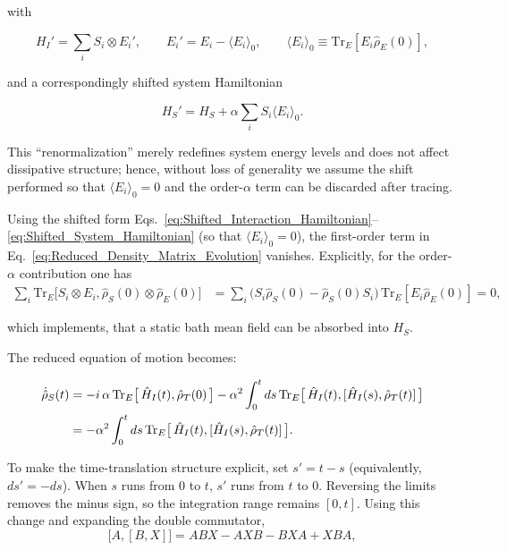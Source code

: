 \noindent
with

\begin{equation}
	H_I' = \sum_i S_i \otimes E_i', \qquad E_i' = E_i - \langle E_i \rangle_0, \qquad \langle E_i \rangle_0 \equiv \mathrm{Tr}_E[E_i \hat{\rho}_E(0)],
	\label{eq:Shifted_Interaction_Hamiltonian}
\end{equation}

\noindent
and a correspondingly shifted system Hamiltonian

\begin{equation}
	H_S' = H_S + \alpha \sum_i S_i \langle E_i \rangle_0.
	\label{eq:Shifted_System_Hamiltonian}
\end{equation}

\noindent
This ``renormalization'' merely redefines system energy levels and does not affect dissipative structure; hence, without loss of generality we assume the shift performed so that $\langle E_i \rangle_0 = 0$ and the order-$\alpha$ term can be discarded after tracing.

\noindent
Using the shifted form Eqs.~\eqref{eq:Shifted_Interaction_Hamiltonian}--\eqref{eq:Shifted_System_Hamiltonian} (so that $\langle E_i \rangle_0 = 0$), the first-order term in Eq.~\eqref{eq:Reduced_Density_Matrix_Evolution} vanishes. Explicitly, for the order-$\alpha$ contribution one has
\begin{align}
	\sum_i \mathrm{Tr}_E\big[ S_i \otimes E_i, \hat{\rho}_S(0) \otimes \hat{\rho}_E(0)\big]
	 & = \sum_i \big(S_i \hat{\rho}_S(0) - \hat{\rho}_S(0) S_i\big) \, \mathrm{Tr}_E[E_i \hat{\rho}_E(0)] = 0,
	\label{eq:Trace_Relation_first_part}
\end{align}

\noindent
which implements, that a static bath mean field can be absorbed into $H_S$.

\noindent
The reduced equation of motion becomes:

\begin{align}
	\dot{\hat{\rho}}_S(t) & = -i \, \alpha \, \mathrm{Tr}_E\big[\,\hat{H}_I(t),\hat{\rho}_T(0)\,\big]
	- \alpha^2 \int_0^t ds\, \mathrm{Tr}_E \big[\,\hat{H}_I(t), [\hat{H}_I(s), \hat{\rho}_T(t)] \,\big] \notag                     \\
	                      & = - \alpha^2 \int_0^t ds\, \mathrm{Tr}_E \big[\,\hat{H}_I(t), [\hat{H}_I(s), \hat{\rho}_T(t)] \,\big].
	\label{eq:Partial_Trace_Derivation}
\end{align}

\noindent
To make the time-translation structure explicit, set $s' = t-s$ (equivalently, $ds' = -ds$). When $s$ runs from $0$ to $t$, $s'$ runs from $t$ to $0$. Reversing the limits removes the minus sign, so the integration range remains $[0,t]$. Using this change and expanding the double commutator,
\begin{equation}
	\label{eq:double_comm_expansion_rule}
	\big[ A, [B, X] \big] = A B X - A X B - B X A + X B A,
\end{equation}

